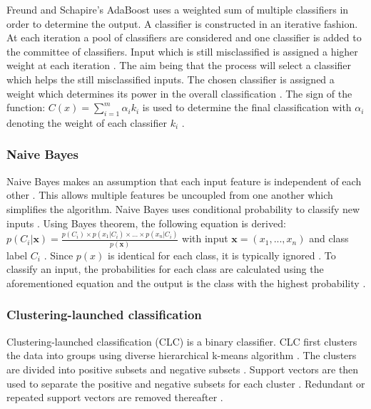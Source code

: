 \documentclass{sig-alternate-05-2015}
\begin{document}
	Freund and Schapire's \cite{FREUND1997119} AdaBoost uses a weighted sum of multiple classifiers in order to determine the output. A classifier is constructed in an iterative fashion. At each iteration a pool of classifiers are considered and one classifier is added to the committee of classifiers. Input which is still misclassified is assigned a higher weight at each iteration \cite{Bergstra2006, rojas2009adaboost}. The aim being that the process will select a classifier which helps the still misclassified inputs. The chosen classifier is assigned a weight which determines its power in the overall classification \cite{Bergstra2006, rojas2009adaboost}. The sign of the function: $C(x) = \sum_{i=1}^{m} \alpha_i k_i$ is used to determine the final classification with $\alpha_i$ denoting the weight of each classifier $k_i$ \cite{Bergstra2006}. 
	
	\subsubsection{Naive Bayes}
	Naive Bayes makes an assumption that each input feature is independent of each other \cite{Lewis1998, rish2001empirical}. This allows multiple features be uncoupled from one another which simplifies the algorithm. Naive Bayes uses conditional probability to classify new inputs \cite{Lewis1998}. Using Bayes theorem, the following equation is derived: $p(C_i|\textbf{x}) = \frac{p(C_i) \times p(x_1|C_i) \times...\times p(x_n|C_i)}{p(\textbf{x})}$ with input $\textbf{x} = (x_1,...,x_n)$ and class label $C_i$ \cite{Lewis1998, rish2001empirical}. Since $p(\textit{x})$ is identical for each class, it is typically ignored \cite{rish2001empirical}. To classify an input, the probabilities for each class are calculated using the aforementioned equation and the output is the class with the highest probability \cite{Lewis1998}.
	
	\subsubsection{Clustering-launched classification}
	Clustering-launched classification (CLC) is a binary classifier. CLC first clusters the data into groups using diverse hierarchical k-means algorithm \cite{Luo20097562}. The clusters are divided into positive subsets and negative subsets \cite{Luo20097562}. Support vectors are then used to separate the positive and negative subsets for each cluster \cite{Luo20097562}. Redundant or repeated support vectors are removed thereafter \cite{Luo20097562}.
	
\end{document}
